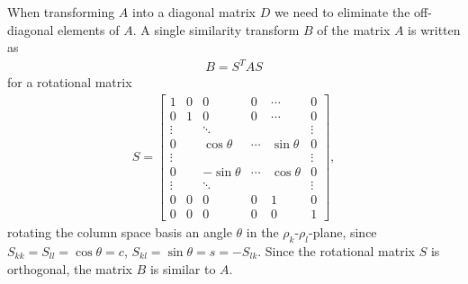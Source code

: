 \documentclass[twocolumn]{aastex62}
\begin{document}
When transforming $A$ into a diagonal matrix $D$ we need to eliminate the off-diagonal elements of $A$. A single similarity transform $B$ of the matrix $A$ is written as
\begin{align}
	B = S^T A S
\end{align}
for a rotational matrix 
\begin{align}
S = 
	\begin{bmatrix}
		1 & 0 & 0 & 0 & \cdots & 0\\
		0 & 1 & 0 & 0 & \cdots & 0 \\	
		\vdots & & \ddots & & & \vdots \\
		0 & & \cos\theta & \cdots & \sin\theta & 0\\
		\vdots & & & & & \vdots \\
		0 & & -\sin\theta & \cdots & \cos\theta & 0\\
		\vdots & & \ddots & & & \vdots \\
		0 & 0 & 0 & 0 & 1 & 0\\		
		0 & 0 & 0 & 0 & 0 & 1
	\end{bmatrix},
\end{align}
rotating the column space basis an angle $\theta$ in the $\rho_k$-$\rho_l$-plane, since $S_{kk} = S_{ll} = \cos\theta = c$, $S_{kl} = \sin\theta = s = -S_{lk}$. Since the rotational matrix $S$ is orthogonal, the matrix $B$ is similar to $A$.
\end{document}
